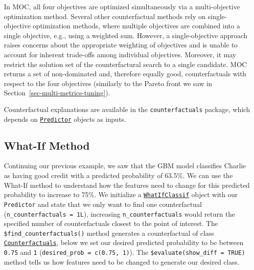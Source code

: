 In MOC, all four objectives are optimized simultaneously via a
multi-objective optimization method. Several other counterfactual
methods rely on single-objective optimization methods, where multiple
objectives are combined into a single objective, e.g., using a weighted
sum. However, a single-objective approach raises concerns about the
appropriate weighting of objectives and is unable to account for
inherent trade-offs among individual objectives. Moreover, it may
restrict the solution set of the counterfactural search to a single
candidate. MOC returns a set of non-dominated and, therefore equally
good, counterfactuals with respect to the four objectives (similarly to
the Pareto front we saw in
Section~\ref{sec-multi-metrics-tuning}).

Counterfactual explanations are available in the
\texttt{counterfactuals} package, which depends on
\href{https://www.rdocumentation.org/packages/iml/topics/Predictor}{\texttt{Predictor}}
objects as inputs.

\hypertarget{what-if-method}{%
\subsection{What-If Method}\label{what-if-method}}

Continuing our previous example, we saw that the GBM model classifies
Charlie as having good credit with a predicted probability of 63.5\%. We
can use the What-If method to understand how the features need to change
for this predicted probability to increase to 75\%. We initialize a
\href{https://www.rdocumentation.org/packages/counterfactuals/topics/WhatIfClassif}{\texttt{WhatIfClassif}}
object with our \texttt{Predictor} and state that we only want to find
one counterfactual (\texttt{n\_counterfactuals\ =\ 1L}), increasing
\texttt{n\_counterfactuals} would return the specified number of
counterfactuals closest to the point of interest. The
\texttt{\$find\_counterfactuals()} method generates a counterfactual of
class
\href{https://www.rdocumentation.org/packages/counterfactuals/topics/Counterfactuals}{\texttt{Counterfactuals}},
below we set our desired predicted probability to be between
\texttt{0.75} and \texttt{1} (\texttt{desired\_prob\ =\ c(0.75,\ 1)}).
The \texttt{\$evaluate(show\_diff\ =\ TRUE)} method tells us how
features need to be changed to generate our desired class.

